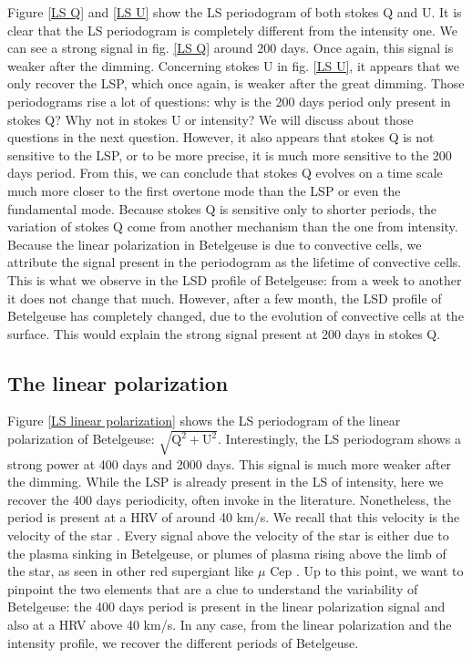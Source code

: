\documentclass{aa}
\begin{document}
Figure \ref{LS Q} and \ref{LS U} show the LS periodogram of both stokes Q and U. It is clear that the LS periodogram is completely different 
from the intensity one. We can see a strong signal in fig. \ref{LS Q} around 200 days. Once again, this signal is weaker after the dimming.
Concerning stokes U in fig. \ref{LS U}, it appears that we only recover the LSP, which once again, is weaker after the great dimming. 
Those periodograms rise a lot of questions: why is the 200 days period only present in stokes Q? Why not in stokes U or intensity? 
We will discuss about those questions in the next question. However, it also appears that stokes Q is not sensitive to the LSP, or to be more precise, 
it is much more sensitive to the 200 days period. From this, we can conclude that stokes Q evolves on a time scale much more closer to the first overtone 
mode than the LSP or even the fundamental mode. Because stokes Q is sensitive only to shorter periods, the variation of stokes Q come from another mechanism 
than the one from intensity. Because the linear polarization in Betelgeuse is due to convective cells, we attribute the signal present in the periodogram 
as the lifetime of convective cells. This is what we observe in the LSD profile of Betelgeuse: from a week to another it does not change that much. 
However, after a few month, the LSD profile of Betelgeuse has completely changed, due to the evolution of convective cells at the surface. 
This would explain the strong signal present at 200 days in stokes Q. 


\subsection{The linear polarization}

Figure \ref{LS linear polarization} shows the LS periodogram of the linear polarization of Betelgeuse: $\sqrt{\mathrm{Q^2+U^2}}$. 
Interestingly, the LS periodogram shows a strong power at 400 days and 2000 days. This signal is much more weaker after the dimming.
While the LSP is already present in the LS of intensity, here we recover the 400 days periodicity, often invoke in the literature. 
Nonetheless, the period is present at a HRV of around 40 km/s. We recall that this velocity is the velocity of the star \cite{lopez_ariste_convective_2018}. 
Every signal above the velocity of the star is either due to the plasma sinking in Betelgeuse, or plumes of plasma rising above the limb of the star, 
as seen in other red supergiant like $\mu$ Cep \citep{lopez_ariste_height_2023}. Up to this point, we want to pinpoint the two elements that are a clue 
to understand the variability of Betelgeuse: the 400 days period is present in the linear polarization signal and also at a HRV above 40 km/s.
In any case, from the linear polarization and the intensity profile, we recover the different periods of Betelgeuse.
\end{document}
